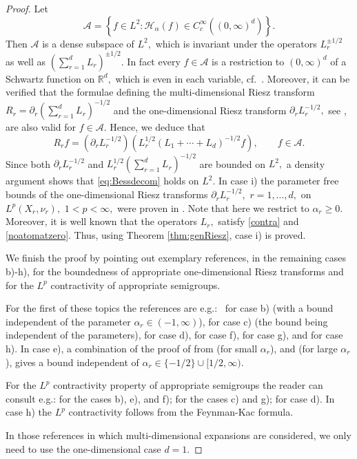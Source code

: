 \documentclass[leqno,12pt]{amsart}
\theoremstyle{definition}
\theoremstyle{remark}
\begin{document}
\begin{proof}
Let $$\mathcal{A}=\left\{f\in L^2 \colon {\mathcal{H}_{\alpha}}(f)\in C_c^{\infty}((0,\infty)^d)\right\}.$$ Then $\mathcal{A}$ is a dense subspace of $L^2,$ which is invariant under the operators $L_r^{\pm 1/2}$ as well as $(\sum_{r=1}^d L_r)^{\pm 1/2}.$ In fact every $f\in \mathcal{A}$ is a restriction to $(0,\infty)^d$ of a Schwartz function on $\mathbb{R}^d,$ which is even in each variable, cf.\ \cite{St1}. Moreover, it can be verified that the formulae defining the multi-dimensional Riesz transform $R_r=\partial_r(\sum_{r=1}^{d} L_r)^{-1/2}$ and the one-dimensional Riesz transform $\partial_r L_r^{-1/2},$ see \cite[Theorem 1.3]{Bet1}, are also valid for $f\in \mathcal{A}.$ Hence, we deduce that
\begin{equation}
\label{eq:Bessdecom} R_r f=(\partial_r L_r^{-1/2})(L_r^{1/2}( L_1+\cdots +L_d)^{-1/2}f),\qquad f\in \mathcal{A}.
\end{equation}
Since both $\partial_r L_r^{-1/2}$ and $L_r^{1/2}( \sum_{r=1}^dL_r)^{-1/2}$ are bounded on $L^2,$ a density argument shows that \eqref{eq:Bessdecom} holds on $L^2.$
In case i) the parameter free bounds of the one-dimensional Riesz transforms $\partial_r L_r^{-1/2},$ $r=1,\ldots,d,$ on $L^p(X_r,\nu_r),$ $1<p<\infty,$ were proven in \cite{Vil1}. Note that here we restrict to $\alpha_r\geq 0.$ Moreover, it is well known that the operators $L_r,$ satisfy \eqref{contra} and \eqref{noatomatzero}. Thus, using Theorem \ref{thm:genRiesz}, case i) is proved.

We finish the proof by pointing out exemplary references, in the remaining cases b)-h), for the boundedness of appropriate one-dimensional Riesz transforms and for the $L^p$ contractivity of appropriate semigroups.

For the first of these topics the references are e.g.:\ \cite[Theorem 3b)]{Muck1} for case b) (with a bound independent of the parameter $\alpha_r\in(-1,\infty)$), \cite{NSj2} for case c) (the bound being independent of the parameters), \cite{ThanRieszHerm} for case d), \cite{NSz1} for case f), \cite[Theorem 1.14, Corollary 17.11]{Muck3} for case g), and \cite{CiSt1} for case h). In case e), a combination of the proof of \cite[Theorem 3.3]{NSRieszLagHerm} from \cite[Sections 5,7]{NSRieszLagHerm} (for small $\alpha_r$), and \cite[Theorem 3.1 and Theorem 5.1]{StWr} (for large $\alpha_r$), gives a bound independent of $\alpha_r\in \{-1/2\}\cup[1/2,\infty).$

For the $L^p$ contractivity property of appropriate semigroups the reader can consult e.g.: \cite{NScontr} for the cases b), e), and f); \cite[Section 2]{NSj1} for the cases c) and g); \cite{HRST} for case d). In case h) the $L^p$ contractivity follows from the Feynman-Kac formula.

In those references in which multi-dimensional expansions are considered, we only need to use the one-dimensional case $d=1.$

\end{proof}
\end{document}
